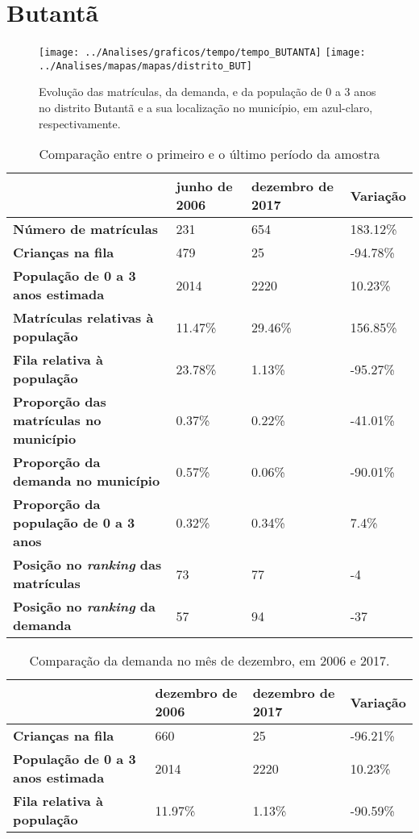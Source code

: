 \section{Butantã}
\begin{figure}[H]
\centering
\texttt{[image: ../Analises/graficos/tempo/tempo\_BUTANTA]}
\texttt{[image: ../Analises/mapas/mapas/distrito\_BUT]}
\caption{Evolução das matrículas, da demanda, e da população de 0 a 3 anos no distrito Butantã e a sua localização no município, em azul-claro, respectivamente.}
\end{figure}
\begin{table}[H]
\begin{tabular}{l|l|l|l}
\textbf{}                                      & \textbf{junho de 2006}       & \textbf{dezembro de 2017}    & \textbf{Variação} \\ \hline
\textbf{Número de matrículas}                  & 231 & 654 & 183.12\% \\ \hline
\textbf{Crianças na fila}                      & 479 & 25 & -94.78\% \\ \hline
\textbf{População de 0 a 3 anos estimada}      & 2014 & 2220 & 10.23\% \\ \hline
\textbf{Matrículas relativas à população}      & 11.47\% & 29.46\% & 156.85\% \\ \hline
\textbf{Fila relativa à população}             & 23.78\% & 1.13\% & -95.27\% \\ \hline
\textbf{Proporção das matrículas no município} & 0.37\% & 0.22\% & -41.01\% \\ \hline
\textbf{Proporção da demanda no município}     & 0.57\% & 0.06\% & -90.01\% \\ \hline
\textbf{Proporção da população de 0 a 3 anos}  & 0.32\% & 0.34\% & 7.4\% \\ \hline
\textbf{Posição no \textit{ranking} das matrículas}     & 73 & 77 & -4 \\ \hline
\textbf{Posição no \textit{ranking} da demanda}         & 57 & 94 & -37 \\ 
\end{tabular}
\caption{Comparação entre o primeiro e o último período da amostra}
\end{table}
\begin{table}[H]
\begin{tabular}{l|l|l|l}
\textbf{}                                 & \textbf{dezembro de 2006} & \textbf{dezembro de 2017} & \textbf{Variação} \\ \hline
\textbf{Crianças na fila}                      & 660 & 25 & -96.21\% \\ \hline
\textbf{População de 0 a 3 anos estimada}      & 2014 & 2220 & 10.23\% \\ \hline
\textbf{Fila relativa à população}             & 11.97\% & 1.13\% & -90.59\% \\
\end{tabular}
\caption{Comparação da demanda no mês de dezembro, em 2006 e 2017.}
\end{table}
